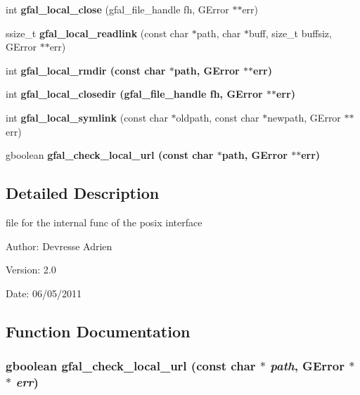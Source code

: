 \begin{CompactItemize}
\item 
int \textbf{gfal\_\-local\_\-close} (gfal\_\-file\_\-handle fh, GError $\ast$$\ast$err)\label{gfal__posix__local__file_8c_145bf9e9edbe0321103e13a665c08d8a}

\item 
ssize\_\-t \textbf{gfal\_\-local\_\-readlink} (const char $\ast$path, char $\ast$buff, size\_\-t buffsiz, GError $\ast$$\ast$err)\label{gfal__posix__local__file_8c_e3c2e173616085706cebd8f39a854685}

\item 
int \bf{gfal\_\-local\_\-rmdir} (const char $\ast$path, GError $\ast$$\ast$err)
\item 
int \bf{gfal\_\-local\_\-closedir} (gfal\_\-file\_\-handle fh, GError $\ast$$\ast$err)
\item 
int \textbf{gfal\_\-local\_\-symlink} (const char $\ast$oldpath, const char $\ast$newpath, GError $\ast$$\ast$err)\label{gfal__posix__local__file_8c_dbae707b88f01b0a663165bbe43d314c}

\item 
gboolean \bf{gfal\_\-check\_\-local\_\-url} (const char $\ast$path, GError $\ast$$\ast$err)
\end{CompactItemize}


\subsection{Detailed Description}
file for the internal func of the posix interface 

\begin{Desc}
\item[Author:]Devresse Adrien \end{Desc}
\begin{Desc}
\item[Version:]2.0 \end{Desc}
\begin{Desc}
\item[Date:]06/05/2011 \end{Desc}


\subsection{Function Documentation}
\subsubsection{\setlength{\rightskip}{0pt plus 5cm}gboolean gfal\_\-check\_\-local\_\-url (const char $\ast$ {\em path}, GError $\ast$$\ast$ {\em err})}\label{gfal__posix__local__file_8c_02987ce8beeb908c36ee3d4ef3bc5618}


